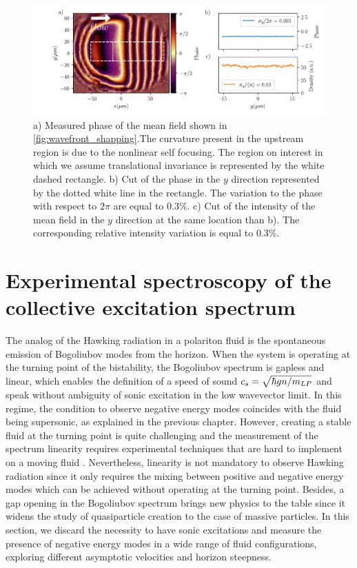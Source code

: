 \begin{figure}[h]
    \centering
    \includegraphics[width=1\textwidth]{chap_custom_st/fig/phase_example.pdf}
    \caption{a) Measured phase of the mean field shown in \autoref{fig:wavefront_shapping}.The curvature present in the upstream region is due to the nonlinear self focusing. The region
    on interest in which we assume translational invariance is represented by the white dashed rectangle. b)  Cut of the phase in the $y$ direction represented by the dotted white line in the rectangle. The variation to the phase with respect
    to $2\pi$ are equal to 0.3\%. c) Cut of the intensity of the mean field in the $y$ direction at the same location than b). The corresponding relative intensity variation is equal to 0.3\%.}
    \label{fig:phase_example}
\end{figure}

\section{Experimental spectroscopy of the collective excitation spectrum}

The analog of the Hawking radiation in a polariton fluid is the spontaneous emission of Bogoliubov modes from the horizon. When the system is operating at the turning point of the bistability, the Bogoliubov spectrum 
is gapless and linear, which enables the definition of a speed of sound $c_s = \sqrt{\hbar g n /m_{LP}}$ and speak without ambiguity of sonic excitation in the low wavevector limit. In this regime, the condition to observe negative energy modes coincides with the fluid being supersonic, as explained in the previous chapter. 
However, creating a stable fluid at the turning point is quite challenging and the measurement of the spectrum linearity requires experimental techniques that are hard to implement on a moving fluid \cite{claude_phd}. Nevertheless, linearity is not mandatory to observe Hawking radiation since 
it only requires the mixing between positive and negative energy modes which can be achieved without operating at the turning point. Besides, a gap opening in the Bogoliubov spectrum brings new physics to the table since it widens the study of quasiparticle creation to the case of massive particles. In this
section, we discard the necessity to have sonic excitations and measure the presence of negative energy modes in a wide range of fluid configurations, exploring different asymptotic velocities and horizon steepness.

